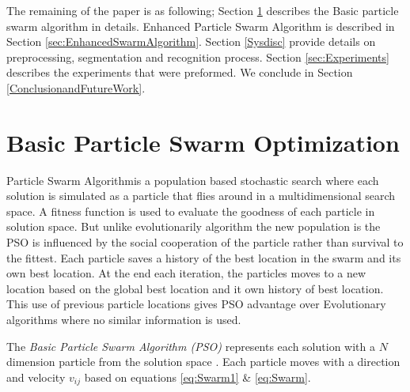 \documentclass[preprint,1p,times,review]{elsarticle}
\begin{document}

The remaining of the paper is as following; Section
\ref{sec:ParticleSwarmAlgorithm} describes the Basic particle swarm algorithm in
details.  Enhanced Particle Swarm Algorithm is described in Section
\ref{sec:EnhancedSwarmAlgorithm}. Section \ref{Sysdisc} provide details on
preprocessing, segmentation and recognition process. Section
\ref{sec:Experiments} describes the experiments that were preformed. We conclude
in Section \ref{ConclusionandFutureWork}.


\section{Basic Particle Swarm Optimization}
\label{sec:ParticleSwarmAlgorithm}

 Particle Swarm Algorithm\cite{PSOFirst}is a population based stochastic search
where each solution is simulated as a  particle that flies around in a
multidimensional search space. A fitness function is used to evaluate the
goodness of each particle in solution space. But unlike evolutionarily algorithm
the new population is the PSO is influenced by the social cooperation of the
particle rather than survival to the fittest. Each particle saves a history of
the best location in the swarm and its own best location.  At the end each
iteration, the particles moves to a new location based on the global best
location and it own history of best location. This use of previous particle
locations gives PSO advantage over Evolutionary algorithms where no similar
information is used.

 The \textit{Basic Particle Swarm Algorithm (PSO)} represents each solution with
a $N$ dimension particle from the solution space \cite{PSOFirst}. Each particle
moves with a direction and velocity $v_{ij}$ based on equations \ref{eq:Swarm1}
\& \ref{eq:Swarm}.
\end{document}
